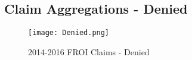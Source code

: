 \documentclass[9pt, oneside]{article}   	%
\begin{document}
\pagebreak




\subsection{Claim Aggregations - Denied}


\setcounter{table}{0}
\renewcommand{\thetable}{D\arabic{table}}



\begin{figure}[h]
\caption{2014-2016 FROI Claims - Denied}
\hspace{1.5in}

\label{Fig:Denied}
\begin{center}
\texttt{[image: Denied.png]}
\end{center}
\end{figure}



\pagebreak








\end{document}
